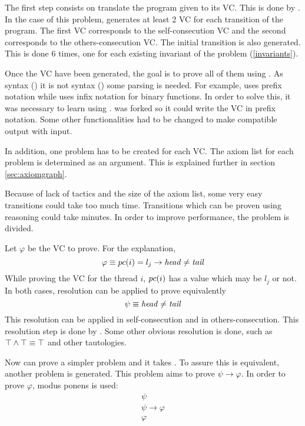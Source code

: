 The first step consists on translate the program given to its \gls{VC}. 
%
This is done by \leap. 
%
In the case of this problem, \leap generates at least 2 \gls{VC} for each transition of the program. 
%
The first \gls{VC} corresponds to the self-consecution \gls{VC} and the second corresponds to the others-consecution \gls{VC}. The initial transition is also generated.
%
This is done 6 times, one for each existing invariant of the problem (\ref{invariants}).

Once the \gls{VC} have been generated, the goal is to prove all of them using \spass. 
%
As \spass syntax (\cite{spasssyntax}) it is not \leap syntax (\cite{leapsyntax}) some parsing is needed. 
%
For example, \spass uses prefix notation while \leap uses infix notation for binary functions.
%
In order to solve this, it was necessary to learn \ocaml using .
%
\leap was forked so it could write the \gls{VC} in prefix notation.
%
Some other \leap functionalities had to be changed to make compatible \leap output with \spass input.

In addition, one \spass problem has to be created for each \gls{VC}. 
%
The axiom list for each problem is determined as an argument. 
%
This is explained further in section \ref{sec:axiomgraph}.

Because of \spass lack of tactics and the size of the axiom list, some very easy transitions could take too much time.
%
Transitions which can be proven using \pc reasoning \spass could take minutes. 
%
In order to improve \spass performance, the problem is divided.

Let $\varphi$ be the \gls{VC} to prove. For the explanation, 
	\[
		\varphi \equiv pc(i) = l_j \to \mathit{head} \not = \mathit{tail}
	\]
While proving the \gls{VC} for the thread $i$, $pc(i)$ has a value which may be $l_j$ or not. 
%
In both cases, resolution can be applied to prove equivalently
	\[
		\psi \equiv \mathit{head} \not = \mathit{tail}
	\]
This resolution can be applied in self-consecution and in others-consecution. 
%
This resolution step is done by \gandalf. 
%
Some other obvious resolution is done, such as $\top \wedge \top \equiv \top$ and other tautologies.

Now \spass can prove a simpler problem and it takes .
%
To assure this is equivalent, another \spass problem is generated. 
%
This \spass problem aims to prove $\psi \to \varphi$.
%
In order to prove $\varphi$, modus ponens is used:
\[
	\begin{array}{l}
		\psi\\
		\psi \to \varphi\\\hline
		\varphi
	\end{array}
\]

